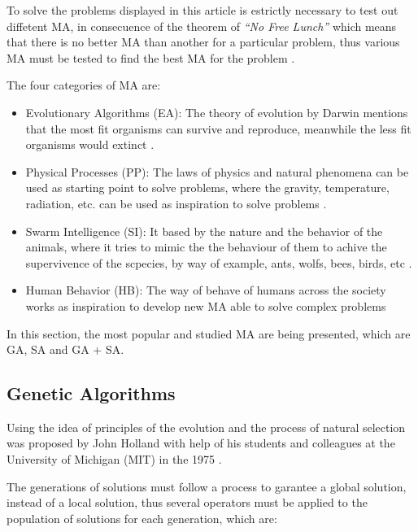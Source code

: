   To solve the problems displayed in this article is estrictly necessary to test out diffetent MA,
  in consecuence of the theorem of \textit{``No Free Lunch''} which means that there is no better
  MA than another for a particular problem, thus various MA must be tested to find the best MA for 
  the problem \cite{almufti2022lion}.

  The four categories of MA are:

  \begin{itemize}
    \item Evolutionary Algorithms (EA): The theory of evolution by Darwin mentions that the 
      most fit organisms can survive and reproduce, meanwhile the less fit 
      organisms would extinct \cite{garg2010evolutionary}.
    
    \item Physical Processes (PP): The laws of physics and natural phenomena can be used as
      starting point to solve problems, where the gravity, temperature, radiation, etc. can be 
      used as inspiration to solve problems \cite{agrawal2021metaheuristic}.

    \item Swarm Intelligence (SI): It based by the nature and the behavior of the animals, 
      where it tries to mimic the the behaviour of them to achive the supervivence of the scpecies,
      by way of example, ants, wolfs, bees, birds, etc \cite{almufti2022lion}.

    \item Human Behavior (HB): The way of behave of humans across the society works as inspiration to 
      develop new MA able to solve complex problems \cite{agrawal2021metaheuristic}
        
  \end{itemize}


  In this section, the most popular and studied MA are being presented, which are GA,
  SA and GA + SA.

  \subsection*{Genetic Algorithms} Using the idea of principles of the evolution
  and the process of natural selection was proposed by John Holland with help
  of his students and colleagues at the University of Michigan (MIT) in the 1975 
  \cite{holland1975adaptation}. 

  The generations of solutions must follow a process to garantee a global solution,
  instead of a local solution, thus several operators must be applied to the 
  population of solutions for each generation, which are:

